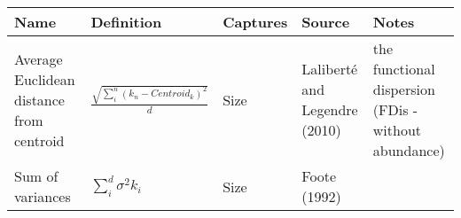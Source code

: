\documentclass[]{article}
\begin{document}
\begin{longtable}[]{@{}lllll@{}}
\toprule
\begin{minipage}[b]{0.12333\columnwidth}\raggedright\strut
Name\strut
\end{minipage} & \begin{minipage}[b]{0.23333\columnwidth}\raggedright\strut
Definition\strut
\end{minipage} & \begin{minipage}[b]{0.08333\columnwidth}\raggedright\strut
Captures\strut
\end{minipage} & \begin{minipage}[b]{0.11\columnwidth}\raggedright\strut
Source\strut
\end{minipage} & \begin{minipage}[b]{0.26\columnwidth}\raggedright\strut
Notes\strut
\end{minipage}\tabularnewline
\midrule
\endhead
\begin{minipage}[t]{0.12333\columnwidth}\raggedright\strut
Average Euclidean distance from centroid\strut
\end{minipage} & \begin{minipage}[t]{0.23333\columnwidth}\raggedright\strut
\(\frac{\sqrt{\sum_{i}^{n}{({k}_{n}-Centroid_{k})^2}}}{d}\)\strut
\end{minipage} & \begin{minipage}[t]{0.08333\columnwidth}\raggedright\strut
Size\strut
\end{minipage} & \begin{minipage}[t]{0.11\columnwidth}\raggedright\strut
Laliberté and Legendre (2010)\strut
\end{minipage} & \begin{minipage}[t]{0.11\columnwidth}\raggedright\strut
the functional dispersion (FDis - without abundance)\strut
\end{minipage}\tabularnewline
\begin{minipage}[t]{0.12333\columnwidth}\raggedright\strut
Sum of variances\strut
\end{minipage} & \begin{minipage}[t]{0.23333\columnwidth}\raggedright\strut
\(\sum_{i}^{d}{\sigma^{2}{k_i}}\)\strut
\end{minipage} & \begin{minipage}[t]{0.08333\columnwidth}\raggedright\strut
Size\strut
\end{minipage} & \begin{minipage}[t]{0.11\columnwidth}\raggedright\strut
Foote (1992)\strut

\end{minipage}
\end{longtable}
\end{document}
